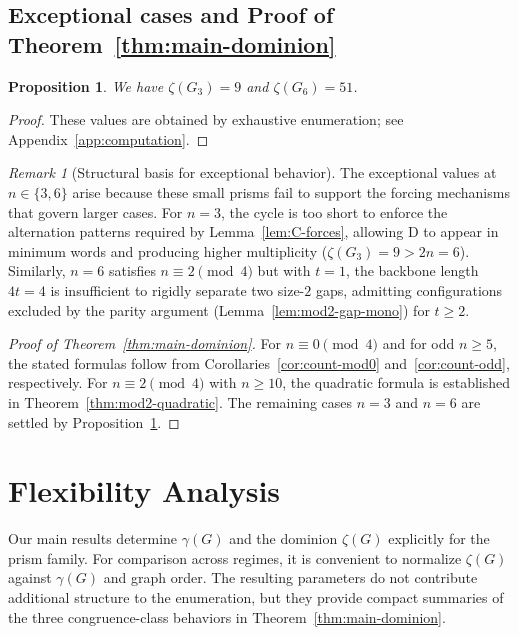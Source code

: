 \documentclass[11pt]{article}
\theoremstyle{plain}
\newtheorem{proposition}[theorem]{Proposition}
\theoremstyle{definition}
\theoremstyle{remark}
\newtheorem{remark}[theorem]{Remark}
\newcommand{\colD}{\mathrm{D}}
\begin{document}
\subsection{Exceptional cases and Proof of Theorem~\ref{thm:main-dominion}}\label{subsec:exceptions}

\begin{proposition}\label{prop:exceptional}
We have $\zeta(G_3)=9$ and $\zeta(G_6)=51$.
\end{proposition}

\begin{proof}
These values are obtained by exhaustive enumeration; see
Appendix~\ref{app:computation}.
\end{proof}

\begin{remark}[Structural basis for exceptional behavior]\label{rem:exceptional}
The exceptional values at $n\in\{3,6\}$ arise because these small prisms fail to support
the forcing mechanisms that govern larger cases.
For $n=3$, the cycle is too short to enforce the alternation patterns required by
Lemma~\ref{lem:C-forces}, allowing $\colD$ to appear in minimum words and producing
higher multiplicity ($\zeta(G_3)=9 > 2n=6$).
Similarly, $n=6$ satisfies $n\equiv 2\pmod{4}$ but with $t=1$, the backbone length $4t=4$
is insufficient to rigidly separate two size-$2$ gaps, admitting configurations excluded
by the parity argument (Lemma~\ref{lem:mod2-gap-mono}) for $t\ge 2$.
\end{remark}

\begin{proof}[Proof of Theorem~\ref{thm:main-dominion}]
For $n\equiv0\pmod4$ and for odd $n\ge5$, the stated formulas follow from
Corollaries~\ref{cor:count-mod0} and~\ref{cor:count-odd}, respectively.
For $n\equiv2\pmod4$ with $n\ge10$, the quadratic formula is established in
Theorem~\ref{thm:mod2-quadratic}.
The remaining cases $n=3$ and $n=6$ are settled by Proposition~\ref{prop:exceptional}.
\end{proof}


\section{Flexibility Analysis}\label{sec:flexibility}

Our main results determine $\gamma(G)$ and the dominion $\zeta(G)$ explicitly for the prism
family.  For comparison across regimes, it is convenient to normalize $\zeta(G)$ against
$\gamma(G)$ and graph order.  The resulting parameters do not contribute additional
structure to the enumeration, but they provide compact summaries of the three
congruence-class behaviors in Theorem~\ref{thm:main-dominion}.
\end{document}
